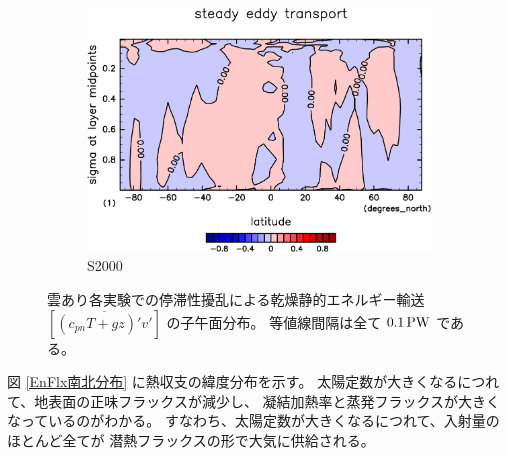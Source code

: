 \documentclass[body]{subfiles}
\begin{document}
\begin{figure}[t]
\begin{subfigure}{.4\textwidth}
		\includegraphics[width=\textwidth]{S2000/MeriHeatTransTest@dryStatEn_SE,time=7300:7665-crop-rotate.pdf}
		\caption{S2000}\label{乾燥静的エネルギー停滞性擾乱S2000}
	\end{subfigure}
	\caption[雲あり各実験でのに停滞性擾乱依る乾燥静的エネルギー輸送の子午面分布]{
		雲あり各実験での停滞性擾乱による乾燥静的エネルギー輸送 \([\overline{(c_{pn}T+gz)'v'}]\) の子午面分布。
		等値線間隔は全て \(0.1\hmu{PW}\) である。
	}\label{乾燥静的エネルギー停滞性擾乱}
\end{figure}

\afterpage{\clearpage}

図 \ref{EnFlx南北分布} に熱収支の緯度分布を示す。
太陽定数が大きくなるにつれて、地表面の正味フラックスが減少し、
凝結加熱率と蒸発フラックスが大きくなっているのがわかる。
すなわち、太陽定数が大きくなるにつれて、入射量のほとんど全てが
潜熱フラックスの形で大気に供給される。
\end{document}
